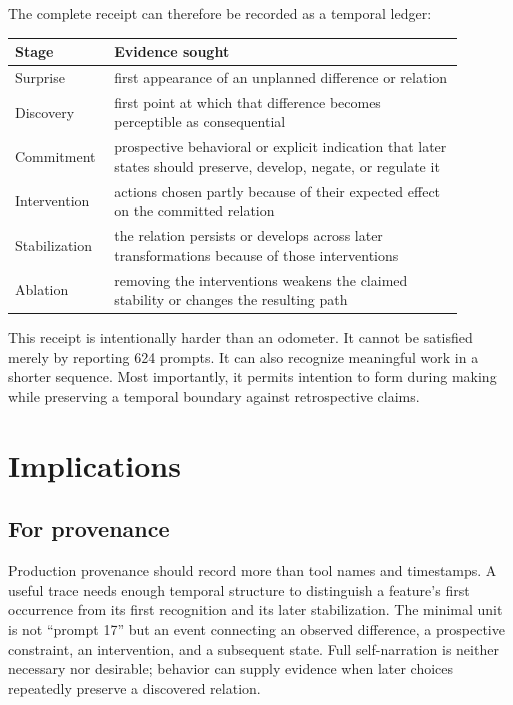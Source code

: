 \documentclass[11pt]{article}
\begin{document}
The complete receipt can therefore be recorded as a temporal ledger:

\begin{center}
\begin{tabular}{p{0.16\linewidth} p{0.73\linewidth}}
\toprule
\textbf{Stage} & \textbf{Evidence sought}\\
\midrule
Surprise & first appearance of an unplanned difference or relation\\
Discovery & first point at which that difference becomes perceptible as consequential\\
Commitment & prospective behavioral or explicit indication that later states should preserve, develop, negate, or regulate it\\
Intervention & actions chosen partly because of their expected effect on the committed relation\\
Stabilization & the relation persists or develops across later transformations because of those interventions\\
Ablation & removing the interventions weakens the claimed stability or changes the resulting path\\
\bottomrule
\end{tabular}
\end{center}

This receipt is intentionally harder than an odometer. It cannot be satisfied merely by reporting 624 prompts. It can also recognize meaningful work in a shorter sequence. Most importantly, it permits intention to form during making while preserving a temporal boundary against retrospective claims.

\section{Implications}

\subsection{For provenance}

Production provenance should record more than tool names and timestamps. A useful trace needs enough temporal structure to distinguish a feature's first occurrence from its first recognition and its later stabilization. The minimal unit is not ``prompt 17'' but an event connecting an observed difference, a prospective constraint, an intervention, and a subsequent state. Full self-narration is neither necessary nor desirable; behavior can supply evidence when later choices repeatedly preserve a discovered relation.
\end{document}
